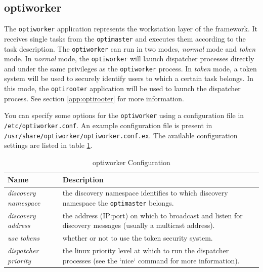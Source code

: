 \documentclass{article}
\begin{document}
\subsection{optiworker}\label{app:optiworker}
The \verb!optiworker! application represents the workstation layer of the framework. It
receives single tasks from the \verb!optimaster! and executes them according to the
task description. The \verb!optiworker! can run in two modes, \textit{normal} mode
and \textit{token} mode. In \textit{normal} mode, the \verb!optiworker! will launch
dispatcher processes directly and under the same privileges as the \verb!optiworker!
process. In \textit{token} mode, a token system will be used to securely
identify users to which a certain task belongs. In this mode, the
\verb!optirooter! application will be used to launch the dispatcher process.
See section \ref{app:optirooter} for more information.

You can specify some
options for the \verb!optiworker! using a configuration file in \verb!/etc/optiworker.conf!.
An example configuration file is present in
\verb!/usr/share/optiworker/optiworker.conf.ex!. The available configuration
settings are listed in table \ref{tab:optiworker_configuration}.

\begin{table}[h!tb]\caption{optiworker Configuration}\label{tab:optiworker_configuration}\vspace{0.1in}
	\centering

	\begin{tabular}{p{4cm} p{10cm}}
		\toprule
		\textbf{Name} & \textbf{Description} \\
		\midrule
		\textit{discovery namespace} & the discovery namespace identifies
		                               to which discovery namespace the
		                               \verb!optimaster! belongs. \\
		\textit{discovery address} & the address (IP:port) on which to
		                             broadcast and listen for discovery
		                             messages (usually a multicast address). \\
		\textit{use tokens} & whether or not to use the token security system. \\
		\textit{dispatcher priority} & the linux priority level at which to
		                               run the dispatcher processes (see the
		                               `nice` command for more information). \\
		\bottomrule
	\end{tabular}
\end{table}
\end{document}
